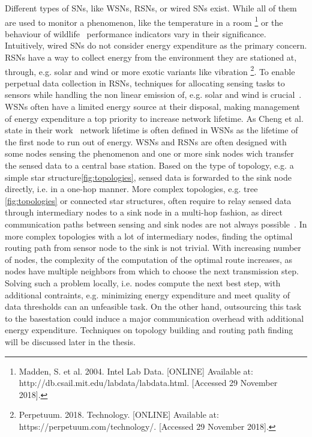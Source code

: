 Different types of \acp{SN}, like \acp{WSN}, \acp{RSN}, or wired \acp{SN} exist. While all of them are used to monitor a phenomenon, like the temperature in a room \footnote{Madden, S. et al. 2004. Intel Lab Data. [ONLINE] Available at: http://db.csail.mit.edu/labdata/labdata.html. [Accessed 29 November 2018].} or the behaviour of wildlife~\cite{bennett2011cranetracker} performance indicators vary in their significance. Intuitively, wired \acp{SN} do not consider energy expenditure as the primary concern. \acp{RSN} have a way to collect energy from the environment they are stationed at, through, e.g. solar and wind or more exotic variants like vibration \footnote{Perpetuum. 2018. Technology. [ONLINE] Available at: https://perpetuum.com/technology/. [Accessed 29 November 2018].}. To enable perpetual data collection in \acp{RSN}, techniques for allocating sensing tasks to sensors while handling the non linear emission of, e.g. solar and wind is crucial~\cite{liu2011perpetual}. \acp{WSN} often have a limited energy source at their disposal, making management of energy expenditure a top priority to increase network lifetime. As Cheng et al. state in their work~\cite{cheng2013stcdg} network lifetime is often defined in \acp{WSN} as the lifetime of the first node to run out of energy. 
\acp{WSN} and \acp{RSN} are often designed with some nodes sensing the phenomenon and one or more sink nodes wich transfer the sensed data to a central base station. Based on the type of topology, e.g. a simple star structure\ref{fig:topologies}, sensed data is forwarded to the sink node directly, i.e. in a one-hop manner. More complex topologies, e.g. tree \ref{fig:topologies} or connected star structures, often require to relay sensed data through intermediary nodes to a sink node in a multi-hop fashion, as direct communication paths between sensing and sink nodes are not always possible~\cite{romer2004design}.
In more complex topologies with a lot of intermediary nodes, finding the optimal routing path from sensor node to the sink is not trivial. 
With increasing number of nodes, the complexity of the computation of the optimal route increases, as nodes have multiple neighbors from which to choose the next transmission step. Solving such a problem locally, i.e. nodes compute the next best step, with additional contraints, e.g. minimizing energy expenditure and meet quality of data thresholds can an unfeasible task. On the other hand, outsourcing this task to the basestation could induce a major communication overhead with additional energy expenditure.
Techniques on topology building and routing path finding will be discussed later in the thesis.

